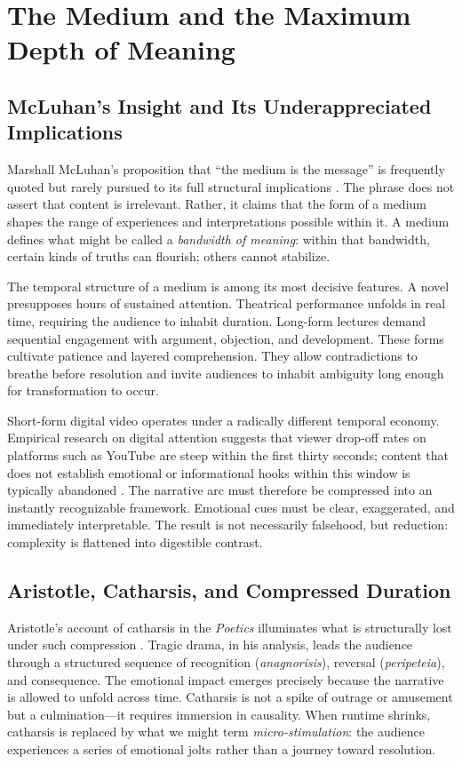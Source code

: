 \documentclass[11pt]{article}
\begin{document}
\section{The Medium and the Maximum Depth of Meaning}
\label{sec:medium}

\subsection{McLuhan's Insight and Its Underappreciated Implications}

Marshall McLuhan's proposition that ``the medium is the message'' is frequently quoted but rarely pursued to its full structural implications \citep{McLuhan1994}. The phrase does not assert that content is irrelevant. Rather, it claims that the form of a medium shapes the range of experiences and interpretations possible within it. A medium defines what might be called a \emph{bandwidth of meaning}: within that bandwidth, certain kinds of truths can flourish; others cannot stabilize.

The temporal structure of a medium is among its most decisive features. A novel presupposes hours of sustained attention. Theatrical performance unfolds in real time, requiring the audience to inhabit duration. Long-form lectures demand sequential engagement with argument, objection, and development. These forms cultivate patience and layered comprehension. They allow contradictions to breathe before resolution and invite audiences to inhabit ambiguity long enough for transformation to occur.

Short-form digital video operates under a radically different temporal economy. Empirical research on digital attention suggests that viewer drop-off rates on platforms such as YouTube are steep within the first thirty seconds; content that does not establish emotional or informational hooks within this window is typically abandoned \citep{Dobrowolski2019}. The narrative arc must therefore be compressed into an instantly recognizable framework. Emotional cues must be clear, exaggerated, and immediately interpretable. The result is not necessarily falsehood, but reduction: complexity is flattened into digestible contrast.

\subsection{Aristotle, Catharsis, and Compressed Duration}

Aristotle's account of catharsis in the \emph{Poetics} illuminates what is structurally lost under such compression \citep{Aristotle1996}. Tragic drama, in his analysis, leads the audience through a structured sequence of recognition (\emph{anagnorisis}), reversal (\emph{peripeteia}), and consequence. The emotional impact emerges precisely because the narrative is allowed to unfold across time. Catharsis is not a spike of outrage or amusement but a culmination---it requires immersion in causality. When runtime shrinks, catharsis is replaced by what we might term \emph{micro-stimulation}: the audience experiences a series of emotional jolts rather than a journey toward resolution.
\end{document}
